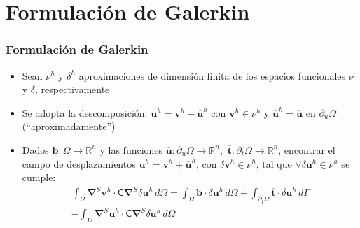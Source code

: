 \documentclass{beamer}
\begin{document}
\section{Formulación de Galerkin}
\begin{frame}
\frametitle{Formulación de Galerkin}
\begin{itemize}
\item Sean $\nu^h$ y $\delta^h$ aproximaciones de dimensión finita de los
espacios funcionales $\nu$ y $\delta$, respectivamente
\item Se adopta la descomposición: $\bm{u}^h=\bm{v}^h+\overline{\bm{u}}^h$
con $\bm{v}^h \in \nu^h$ y 
$\overline{\bm{u}}^h=\overline{\bm{u}}$ en $\partial_u \Omega$ (``aproximadamente'')
\item Dados $\bm{b}:\overline{\Omega}\rightarrow \mathbb{R}^n$ y las funciones
$\overline{\bm{u}}:\partial_u \Omega  \rightarrow \mathbb{R}^n$,\, 
$\overline{\bm{t}}:\partial_t \Omega  \rightarrow \mathbb{R}^n$, 
encontrar el campo de
desplazamientos $\bm{u}^h=\bm{v}^h+\overline{\bm{u}}^h$, con $\delta \bm{v}^h
\in \nu^h$, tal que
$\forall \delta \bm{u}^h \in \nu^h$ se cumple:
\begin{equation}
\begin{split}
\int_{\Omega}
\bm{\nabla}^{S} \bm{v}^h \cdot \bm{\mathsf{C}}
\bm{\nabla}^{S}\delta \bm{u}^h \, d \Omega
=\int_{\Omega} \bm{b} \cdot \delta \bm{u}^h \, d \Omega
+\int_{\partial_t \Omega} \overline{\bm{t}}\cdot
\delta \bm{u}^h \, d \Gamma \\
-\int_{\Omega} \bm{\nabla}^{S} \overline{\bm{u}}^h \cdot \bm{\mathsf{C}}
\bm{\nabla}^{S}\delta \bm{u}^h \, d \Omega
\end{split}
\label{ecvapr1}
\end{equation}
\end{itemize}
\end{frame}
\end{document}
